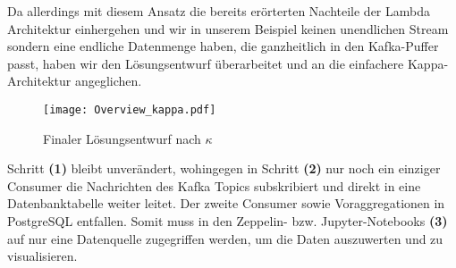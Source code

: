 Da allerdings mit diesem Ansatz die bereits erörterten Nachteile der Lambda Architektur einhergehen und wir in unserem Beispiel keinen unendlichen Stream sondern eine endliche Datenmenge haben, die ganzheitlich in den Kafka-Puffer passt, haben wir den Lösungsentwurf überarbeitet und an die einfachere Kappa-Architektur angeglichen.

\begin{figure}[h] %
	\centering
	\texttt{[image: Overview\_kappa.pdf]}
	\caption[Finaler Lösungsentwurf nach $\kappa$]{Finaler Lösungsentwurf nach $\kappa$}
	\label{fig:OurKappaArchitecture}
\end{figure}

Schritt \textbf{(1)} bleibt unverändert, wohingegen in Schritt \textbf{(2)} nur noch ein einziger Consumer die Nachrichten des Kafka Topics subskribiert und direkt in eine Datenbanktabelle weiter leitet. Der zweite Consumer sowie Voraggregationen in PostgreSQL entfallen.  Somit muss in den Zeppelin- bzw. Jupyter-Notebooks \textbf{(3)} auf nur eine Datenquelle zugegriffen werden, um die Daten auszuwerten und zu visualisieren.


